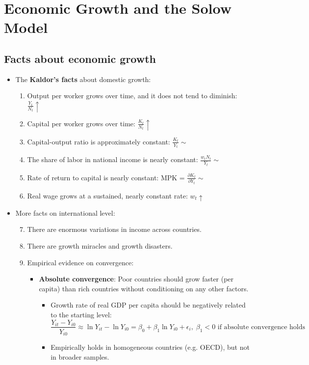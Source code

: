 \documentclass[notitlepage]{article}
\begin{document}
\section{Economic Growth and the Solow Model}
\subsection{Facts about economic growth}
\begin{itemize}
\item The \textbf{Kaldor's facts} about domestic growth:
\begin{enumerate}
\item Output per worker grows over time, and it does not tend to diminish: $\frac{Y_t}{N_t} \uparrow$
\item Capital per worker grows over time: $\frac{K_t}{N_t} \uparrow$
\item Capital-output ratio is approximately constant: $\frac{K_t}{Y_t} \sim$
\item The share of labor in national income is nearly constant: $\frac{w_tN_t}{Y_t} \sim$
\item Rate of return to capital is nearly constant: MPK = $\frac{\partial K_t}{\partial Y_t} \sim$
\item Real wage grows at a sustained, nearly constant rate: $w_t \uparrow$
\end{enumerate}
\item More facts on international level:
\begin{enumerate} \setcounter{enumi}{6}
\item There are enormous variations in income across countries.
\item There are growth miracles and growth disasters.
\item Empirical evidence on convergence:
\begin{itemize}
\item \textbf{Absolute convergence}: Poor countries should grow faster (per capita) than rich countries without conditioning on any other factors.
\begin{itemize}
\item Growth rate of real GDP per capita should be negatively related to the starting level:
\[
\frac{Y_{it}  - Y_{i0}}{Y_{i0}} \approx \ln Y_{it} - \ln Y_{i0} = \beta_0 + \beta_1 \ln Y_{i0} + \epsilon_i, \;\beta_1 < 0 \text{ if absolute convergence holds}
\]
\item Empirically holds in homogeneous countries (e.g. OECD), but not in broader samples.
\end{itemize}
\end{itemize}


\end{enumerate}
\end{itemize}
\end{document}
